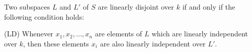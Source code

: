Two subspaces $L$ and $L'$ of $S$ are linearly disjoint over $k$ if and only if the following condition holds:

(LD) Whenever $x_1, x_2, \dots, x_n$ are elements of $L$ which are linearly independent over $k$, then these elements $x_i$ are also linearly independent over $L'$.
